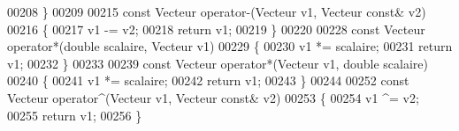 \begin{DoxyCode}
00208 \}
00209 
00215 \textcolor{keyword}{const} Vecteur operator-(Vecteur v1, Vecteur \textcolor{keyword}{const}& v2) 
00216 \{
00217     v1 -= v2;
00218     \textcolor{keywordflow}{return} v1;
00219 \}
00220 
00228 \textcolor{keyword}{const} Vecteur operator*(\textcolor{keywordtype}{double} scalaire, Vecteur v1)
00229 \{
00230     v1 *= scalaire;
00231     \textcolor{keywordflow}{return} v1;
00232 \}
00233 
00239 \textcolor{keyword}{const} Vecteur operator*(Vecteur v1, \textcolor{keywordtype}{double} scalaire)
00240 \{
00241     v1 *= scalaire;
00242     \textcolor{keywordflow}{return} v1;
00243 \}
00244 
00252 \textcolor{keyword}{const} Vecteur operator^(Vecteur v1, Vecteur \textcolor{keyword}{const}& v2)
00253 \{
00254     v1 ^= v2;
00255     \textcolor{keywordflow}{return} v1;
00256 \}
\end{DoxyCode}
